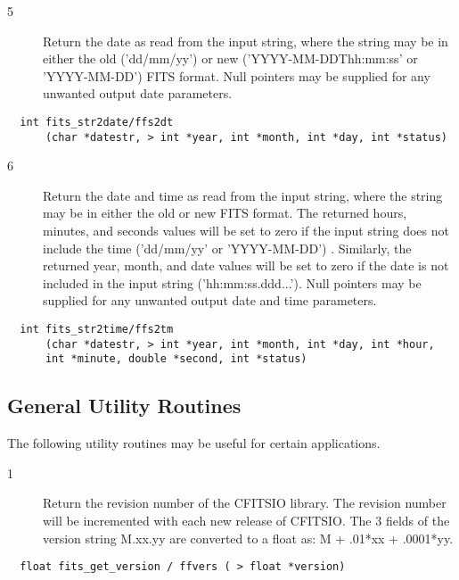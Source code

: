 \documentclass[11pt]{book}
\begin{document}
\begin{description}
\item[5 ] Return the date as read from the input string, where the string may be
in either the old ('dd/mm/yy')  or new ('YYYY-MM-DDThh:mm:ss' or
'YYYY-MM-DD') FITS format.  Null pointers may be supplied for any
  unwanted output date parameters.
\end{description}

\begin{verbatim}
  int fits_str2date/ffs2dt
      (char *datestr, > int *year, int *month, int *day, int *status)
\end{verbatim}


\begin{description}
\item[6 ] Return the date and time as read from the input string, where the
string may be in either the old  or new FITS format.  The returned hours,
minutes, and seconds values will be set to zero if the input string
does not include the time ('dd/mm/yy' or 'YYYY-MM-DD') .  Similarly,
the returned year, month, and date values will be set to zero if the
date is not included in the input string ('hh:mm:ss.ddd...').  Null
pointers may be supplied for any unwanted output date and time
parameters.
\end{description}

\begin{verbatim}
  int fits_str2time/ffs2tm
      (char *datestr, > int *year, int *month, int *day, int *hour,
      int *minute, double *second, int *status)
\end{verbatim}


\subsection{General Utility Routines}

The following utility routines may be useful for certain applications.


\begin{description}
\item[1 ] Return the revision number of the CFITSIO library.
    The revision number will be incremented with each new
   release of CFITSIO. The 3 fields of the version string M.xx.yy
   are converted to a float as: M + .01*xx + .0001*yy. \label{ffvers}
\end{description}

\begin{verbatim}
  float fits_get_version / ffvers ( > float *version)
\end{verbatim}
\end{document}
